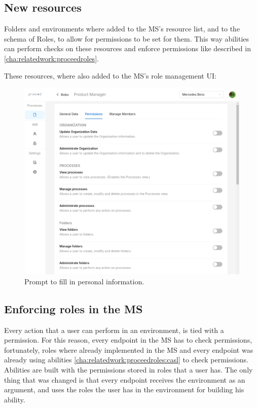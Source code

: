 \subsection{New resources}

Folders and environments where added to the MS's resource list, and to the schema of
Roles, to allow for permissions to be set for them.
This way abilities can perform checks on these resources and enforce permissions like
described in \ref{cha:relatedwork:proceedroles}.

These resources, where also added to the MS's role management UI:

\begin{figure}[H]
    \centering
    \includegraphics[scale=0.2]{images/role-permissions-view.png}
    \caption{Prompt to fill in personal information.}
    \vspace{-1em} %
    \label{fig:prompt-fill-personal-information}
\end{figure}



\subsection{Enforcing roles in the MS}

Every action that a user can perform in an environment, is tied with a permission.
For this reason, every endpoint in the MS has to check permissions, fortunately, roles
where already implemented in the MS and every endpoint was already using abilities
\ref{cha:relatedwork:proceedroles:casl} to check permissions.
Abilities are built with the permissions stored in roles that a user has.
The only thing that was changed is that every endpoint receives the environment as an
argument, and uses the roles the user has in the environment for building his ability.

